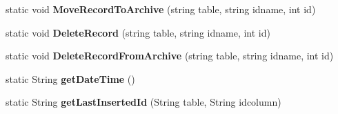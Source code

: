 \begin{DoxyCompactItemize}
\item 
\mbox{\label{class_m_s_a_m_i_s_user_interface_1_1_s_q_l_tools_ab67058f3fac16da4790e8f862096cb13}} 
static void {\bfseries Move\+Record\+To\+Archive} (string table, string idname, int id)
\item 
\mbox{\label{class_m_s_a_m_i_s_user_interface_1_1_s_q_l_tools_ac1528bb3729a69d4f834e3cc3d377c3d}} 
static void {\bfseries Delete\+Record} (string table, string idname, int id)
\item 
\mbox{\label{class_m_s_a_m_i_s_user_interface_1_1_s_q_l_tools_ac734f502e5f5ca52c6c71bc1a942de3a}} 
static void {\bfseries Delete\+Record\+From\+Archive} (string table, string idname, int id)
\item 
\mbox{\label{class_m_s_a_m_i_s_user_interface_1_1_s_q_l_tools_a9406c271ce9f7c74257c155c03894efa}} 
static String {\bfseries get\+Date\+Time} ()
\item 
\mbox{\label{class_m_s_a_m_i_s_user_interface_1_1_s_q_l_tools_adb86eed362559c4d0de91b4d92e5383c}} 
static String {\bfseries get\+Last\+Inserted\+Id} (String table, String idcolumn)
\end{DoxyCompactItemize}
